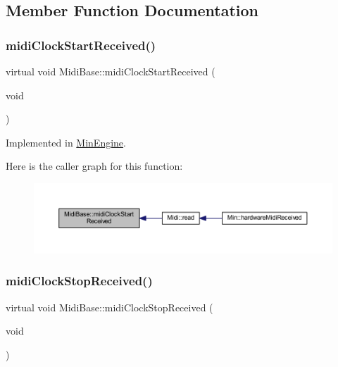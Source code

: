 \subsection{Member Function Documentation}
\mbox{\label{class_midi_base_aa368fed406eb62f900beb801e0552709}} 
\subsubsection{\texorpdfstring{midi\+Clock\+Start\+Received()}{midiClockStartReceived()}}
{\footnotesize\ttfamily virtual void Midi\+Base\+::midi\+Clock\+Start\+Received (\begin{DoxyParamCaption}\item[{void}]{ }\end{DoxyParamCaption})\hspace{0.3cm}{\ttfamily [pure virtual]}}



Implemented in \hyperlink{class_min_engine_ad0378027f052b780481611fa4335b68d}{Min\+Engine}.

Here is the caller graph for this function\+:
\nopagebreak
\begin{figure}[H]
\begin{center}
\leavevmode
\includegraphics[width=350pt]{class_midi_base_aa368fed406eb62f900beb801e0552709_icgraph}
\end{center}
\end{figure}
\mbox{\label{class_midi_base_ab9a5c65ebffdfc31e118fef9e4dd04bb}} 
\subsubsection{\texorpdfstring{midi\+Clock\+Stop\+Received()}{midiClockStopReceived()}}
{\footnotesize\ttfamily virtual void Midi\+Base\+::midi\+Clock\+Stop\+Received (\begin{DoxyParamCaption}\item[{void}]{ }\end{DoxyParamCaption})\hspace{0.3cm}{\ttfamily [pure virtual]}}



